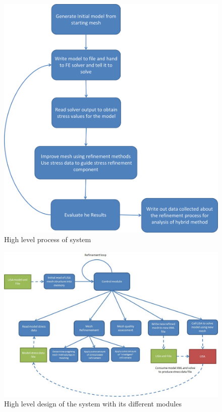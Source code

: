 \begin{figure}[H]
  \centerline{\includegraphics[width=120mm, scale=1]{../Graphics/OverallProcess.png}}
  \caption{High level process of system}
  \label{fig:h-refinementImp}
\end{figure}



\begin{figure}[H]
  \centerline{\includegraphics[width=150mm, scale=1]{../Graphics/SystemDesignDiagram.jpeg}}
  \caption{High level design of the system with its different modules}
  \label{fig:h-refinementImp}
\end{figure}




